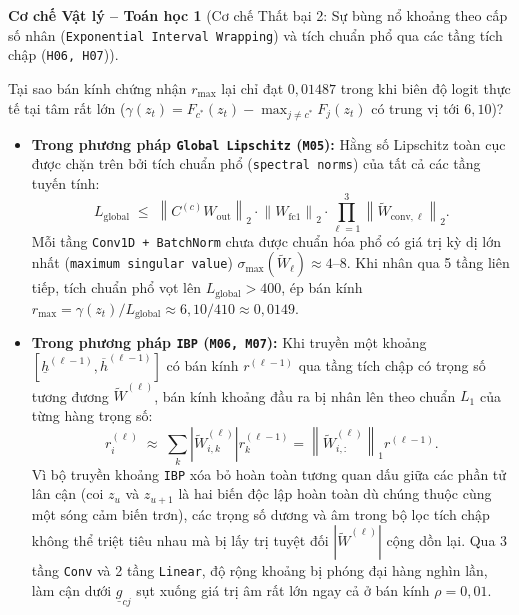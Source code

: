 \documentclass[11pt,a4paper]{article}
\newcommand{\norm}[1]{\left\lVert #1\right\rVert}
\newcommand{\abs}[1]{\left\lvert #1\right\rvert}
\newcommand{\code}[1]{{\small\ttfamily\nolinkurl{#1}}}
\newtheorem{mechanism}{Cơ chế Vật lý -- Toán học}[section]
\begin{document}
\begin{mechanism}[Cơ chế Thất bại 2: Sự bùng nổ khoảng theo cấp số nhân (\code{Exponential Interval Wrapping}) và tích chuẩn phổ qua các tầng tích chập (\code{H06, H07})]
\end{mechanism}
Tại sao bán kính chứng nhận $r_{\max}$ lại chỉ đạt $0,01487$ trong khi biên độ logit thực tế tại tâm rất lớn ($\gamma(z_t) = F_{c^*}(z_t) - \max_{j \neq c^*} F_j(z_t)$ có trung vị tới $6,10$)?
\begin{itemize}
  \item \textbf{Trong phương pháp \code{Global Lipschitz} (\code{M05}):} Hằng số Lipschitz toàn cục được chặn trên bởi tích chuẩn phổ (\code{spectral norms}) của tất cả các tầng tuyến tính:
  \begin{equation}
    L_{\text{global}} \;\le\; \norm{C^{(c)} W_{\text{out}}}_2 \cdot \norm{W_{\text{fc1}}}_2 \cdot \prod_{\ell=1}^{3} \norm{\widetilde{W}_{\text{conv},\ell}}_2.
  \end{equation}
  Mỗi tầng \code{Conv1D + BatchNorm} chưa được chuẩn hóa phổ có giá trị kỳ dị lớn nhất (\code{maximum singular value}) $\sigma_{\max}(\widetilde{W}_\ell) \approx 4\text{--}8$. Khi nhân qua 5 tầng liên tiếp, tích chuẩn phổ vọt lên $L_{\text{global}} > 400$, ép bán kính $r_{\max} = \gamma(z_t) / L_{\text{global}} \approx 6,10 / 410 \approx 0,0149$.
  \item \textbf{Trong phương pháp \code{IBP} (\code{M06, M07}):} Khi truyền một khoảng $[\underline{h}^{(\ell-1)}, \overline{h}^{(\ell-1)}]$ có bán kính $r^{(\ell-1)}$ qua tầng tích chập có trọng số tương đương $\widetilde{W}^{(\ell)}$, bán kính khoảng đầu ra bị nhân lên theo chuẩn $L_1$ của từng hàng trọng số:
  \begin{equation}
    r^{(\ell)}_i \;\approx\; \sum_{k} \abs{\widetilde{W}^{(\ell)}_{i, k}} r^{(\ell-1)}_k = \norm{\widetilde{W}^{(\ell)}_{i, :}}_1 r^{(\ell-1)}.
  \end{equation}
  Vì bộ truyền khoảng \code{IBP} xóa bỏ hoàn toàn tương quan dấu giữa các phần tử lân cận (coi $z_u$ và $z_{u+1}$ là hai biến độc lập hoàn toàn dù chúng thuộc cùng một sóng cảm biến trơn), các trọng số dương và âm trong bộ lọc tích chập không thể triệt tiêu nhau mà bị lấy trị tuyệt đối $\abs{\widetilde{W}^{(\ell)}}$ cộng dồn lại. Qua 3 tầng \code{Conv} và 2 tầng \code{Linear}, độ rộng khoảng bị phóng đại hàng nghìn lần, làm cận dưới $\underline{g}_{cj}$ sụt xuống giá trị âm rất lớn ngay cả ở bán kính $\rho = 0,01$.
\end{itemize}
\end{document}
